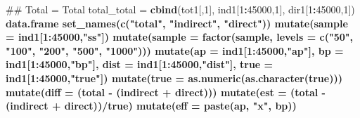 \documentclass[]{DissertateUSU}
\newenvironment{Shaded}{\begin{snugshade}}{\end{snugshade}}
\newcommand{\KeywordTok}[1]{\textcolor[rgb]{0.13,0.29,0.53}{\textbf{#1}}}
\newcommand{\DataTypeTok}[1]{\textcolor[rgb]{0.13,0.29,0.53}{#1}}
\newcommand{\DecValTok}[1]{\textcolor[rgb]{0.00,0.00,0.81}{#1}}
\newcommand{\StringTok}[1]{\textcolor[rgb]{0.31,0.60,0.02}{#1}}
\newcommand{\OperatorTok}[1]{\textcolor[rgb]{0.81,0.36,0.00}{\textbf{#1}}}
\newcommand{\NormalTok}[1]{#1}
\begin{document}
\begin{Shaded}
\begin{Highlighting}[]
\NormalTok{## Total = Total}
\NormalTok{total_total =}\StringTok{ }\KeywordTok{cbind}\NormalTok{(tot1[,}\DecValTok{1}\NormalTok{], ind1[}\DecValTok{1}\OperatorTok{:}\DecValTok{45000}\NormalTok{,}\DecValTok{1}\NormalTok{], dir1[}\DecValTok{1}\OperatorTok{:}\DecValTok{45000}\NormalTok{,}\DecValTok{1}\NormalTok{]) }\OperatorTok{%>%}
\StringTok{  }\NormalTok{data.frame }\OperatorTok{%>%}
\StringTok{  }\KeywordTok{set_names}\NormalTok{(}\KeywordTok{c}\NormalTok{(}\StringTok{"total"}\NormalTok{, }\StringTok{"indirect"}\NormalTok{, }\StringTok{"direct"}\NormalTok{)) }\OperatorTok{%>%}
\StringTok{  }\KeywordTok{mutate}\NormalTok{(}\DataTypeTok{sample =}\NormalTok{ ind1[}\DecValTok{1}\OperatorTok{:}\DecValTok{45000}\NormalTok{,}\StringTok{"ss"}\NormalTok{]) }\OperatorTok{%>%}
\StringTok{  }\KeywordTok{mutate}\NormalTok{(}\DataTypeTok{sample =} \KeywordTok{factor}\NormalTok{(sample,}
                         \DataTypeTok{levels =} \KeywordTok{c}\NormalTok{(}\StringTok{"50"}\NormalTok{, }\StringTok{"100"}\NormalTok{, }\StringTok{"200"}\NormalTok{, }\StringTok{"500"}\NormalTok{, }\StringTok{"1000"}\NormalTok{))) }\OperatorTok{%>%}
\StringTok{  }\KeywordTok{mutate}\NormalTok{(}\DataTypeTok{ap   =}\NormalTok{ ind1[}\DecValTok{1}\OperatorTok{:}\DecValTok{45000}\NormalTok{,}\StringTok{"ap"}\NormalTok{],}
         \DataTypeTok{bp   =}\NormalTok{ ind1[}\DecValTok{1}\OperatorTok{:}\DecValTok{45000}\NormalTok{,}\StringTok{"bp"}\NormalTok{],}
         \DataTypeTok{dist =}\NormalTok{ ind1[}\DecValTok{1}\OperatorTok{:}\DecValTok{45000}\NormalTok{,}\StringTok{"dist"}\NormalTok{],}
         \DataTypeTok{true =}\NormalTok{ ind1[}\DecValTok{1}\OperatorTok{:}\DecValTok{45000}\NormalTok{,}\StringTok{"true"}\NormalTok{]) }\OperatorTok{%>%}
\StringTok{  }\KeywordTok{mutate}\NormalTok{(}\DataTypeTok{true =} \KeywordTok{as.numeric}\NormalTok{(}\KeywordTok{as.character}\NormalTok{(true))) }\OperatorTok{%>%}
\StringTok{  }\KeywordTok{mutate}\NormalTok{(}\DataTypeTok{diff =}\NormalTok{ (total }\OperatorTok{-}\StringTok{ }\NormalTok{(indirect }\OperatorTok{+}\StringTok{ }\NormalTok{direct))) }\OperatorTok{%>%}
\StringTok{  }\KeywordTok{mutate}\NormalTok{(}\DataTypeTok{est  =}\NormalTok{ (total }\OperatorTok{-}\StringTok{ }\NormalTok{(indirect }\OperatorTok{+}\StringTok{ }\NormalTok{direct))}\OperatorTok{/}\NormalTok{true) }\OperatorTok{%>%}
\StringTok{  }\KeywordTok{mutate}\NormalTok{(}\DataTypeTok{eff  =} \KeywordTok{paste}\NormalTok{(ap, }\StringTok{"x"}\NormalTok{, bp)) }\OperatorTok{%>%}
}}}}}}}}}}
\end{Highlighting}
\end{Shaded}
\end{document}
